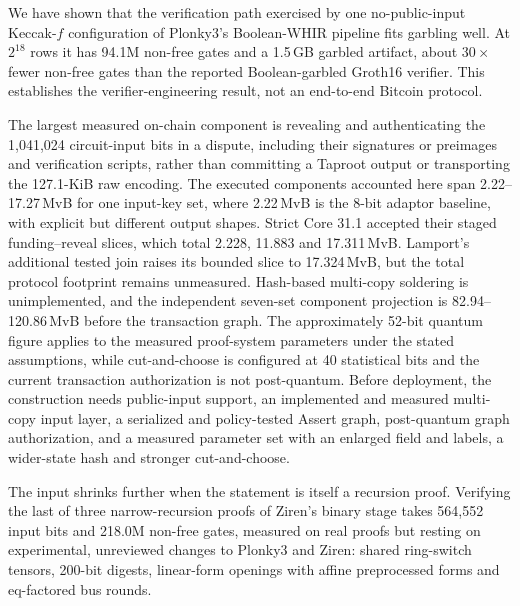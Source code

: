 \documentclass[11pt]{article}
\begin{document}
We have shown that the verification path exercised by one no-public-input
Keccak-$f$ configuration of Plonky3's Boolean-WHIR pipeline fits garbling well.
At $2^{18}$ rows it has 94.1M non-free gates and a 1.5\,GB garbled artifact,
about $30\times$ fewer non-free gates than the reported Boolean-garbled Groth16
verifier. This establishes the verifier-engineering result, not an end-to-end
Bitcoin protocol.

The largest measured on-chain component is revealing and authenticating the
1{,}041{,}024 circuit-input bits in a dispute, including their signatures or
preimages and verification scripts, rather than committing a Taproot output or
transporting the 127.1-KiB raw encoding. The executed components accounted here span
2.22--17.27\,MvB for one input-key set, where 2.22\,MvB is the 8-bit adaptor
baseline, with explicit but different output
shapes. Strict Core 31.1 accepted their staged funding--reveal slices, which
total 2.228, 11.883 and 17.311\,MvB. Lamport's additional tested join raises
its bounded slice to 17.324\,MvB, but the total protocol footprint remains unmeasured.
Hash-based multi-copy soldering is unimplemented, and the
independent seven-set component projection is 82.94--120.86\,MvB before the
transaction graph. The approximately 52-bit
quantum figure applies to the measured proof-system parameters under the stated
assumptions, while cut-and-choose is configured at 40 statistical bits and the
current transaction authorization is not post-quantum. Before deployment, the
construction needs public-input support, an implemented and measured multi-copy
input layer, a serialized and policy-tested Assert graph, post-quantum graph
authorization, and a measured parameter set with an enlarged field and labels,
a wider-state hash and stronger cut-and-choose.

The input shrinks further when the statement is itself a recursion proof.
Verifying the last of three narrow-recursion proofs of Ziren's binary stage
takes 564{,}552 input bits and 218.0M non-free gates, measured on real proofs
but resting on experimental, unreviewed changes to Plonky3 and Ziren: shared
ring-switch tensors, 200-bit digests, linear-form openings with affine
preprocessed forms and eq-factored bus rounds.


{\raggedright}
\end{document}
